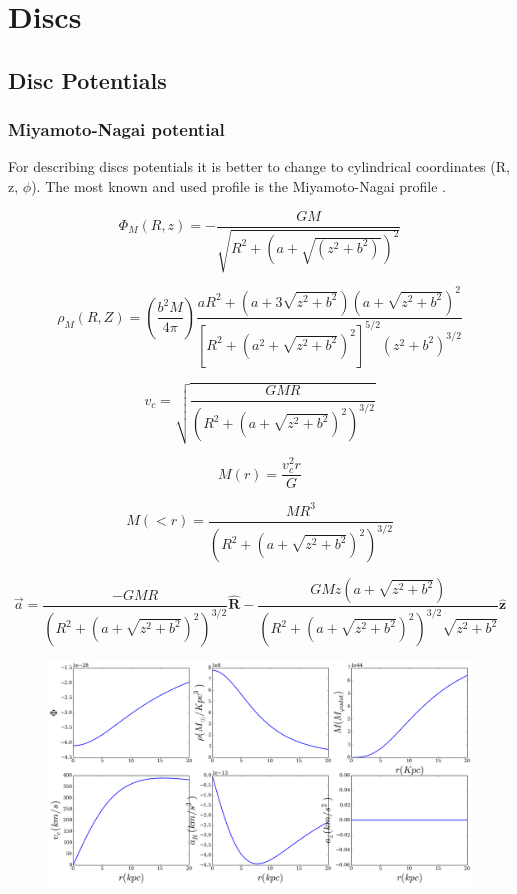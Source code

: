\chapter{Discs}\label{sec:Discs}
\section{Disc Potentials}

\subsection{Miyamoto-Nagai potential}

For describing discs potentials it is better to change to 
cylindrical coordinates (R, z, $\phi$). The most known and 
used profile is the Miyamoto-Nagai profile \citep{Miyamoto75}. 

\begin{equation}
\Phi_M (R, z) = - \dfrac{GM}{\sqrt{R^2 + (a + \sqrt{(z^2 + b^2)})^2}}
\end{equation}

\begin{equation}
\rho_M (R, Z) = \left( \dfrac{b^2 M}{4 \pi} \right) \dfrac{aR^2 + (a + 3\sqrt{z^2+b^2})(a + \sqrt{z^2+b^2})^2}{[R^2 + (a^2 + \sqrt{z^2+b^2})^2]^{5/2}(z^2+b^2)^{3/2} }
\end{equation}


\begin{equation}
v_c = \sqrt{\dfrac{GMR}{(R^2 + (a + \sqrt{z^2 + b^2})^2)^{3/2}}}
\end{equation}

\begin{equation}
M(r) = \dfrac{v_c^2 r}{G} 
\end{equation}

\begin{equation}
M(<r) = \dfrac{M R^3}{(R^2 + (a + \sqrt{z^2+b^2})^2)^{3/2}}
\end{equation}

\begin{equation}
\vec{a} = \dfrac{-GMR}{(R^2 + (a + \sqrt{z^2 + b^2})^2)^{3/2}} \mathbf{\hat{R}} - \dfrac{GMz (a + \sqrt{z^2+b^2})}{(R^2 + (a + \sqrt{z^2 + b^2})^2)^{3/2}\sqrt{z^2+b^2}} \mathbf{\hat{z}}
\end{equation}

\begin{figure}[H]\label{fig:MN}
\includegraphics[scale=0.35]{../figures/mn.png}
\end{figure}


